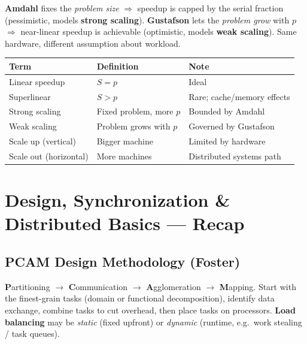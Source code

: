 \documentclass[11pt,a4paper]{article}
\begin{document}
\begin{alertbox}
\textbf{Amdahl} fixes the \emph{problem size} $\Rightarrow$ speedup is capped by the serial fraction (pessimistic, models \textbf{strong scaling}). \textbf{Gustafson} lets the \emph{problem grow} with $p$ $\Rightarrow$ near-linear speedup is achievable (optimistic, models \textbf{weak scaling}). Same hardware, different assumption about workload.
\end{alertbox}

\begin{longtable}{@{}p{3.8cm}p{4.4cm}p{5.0cm}@{}}
\toprule
\rowcolor{primary!15}
\textbf{Term} & \textbf{Definition} & \textbf{Note} \\
\midrule
\endhead
Linear speedup & $S = p$ & Ideal \\
Superlinear & $S > p$ & Rare; cache/memory effects \\
Strong scaling & Fixed problem, more $p$ & Bounded by Amdahl \\
Weak scaling & Problem grows with $p$ & Governed by Gustafson \\
Scale up (vertical) & Bigger machine & Limited by hardware \\
Scale out (horizontal) & More machines & Distributed systems path \\
\bottomrule
\end{longtable}

\section{Design, Synchronization \& Distributed Basics --- Recap}

\subsection{PCAM Design Methodology (Foster)}
\textbf{P}artitioning $\to$ \textbf{C}ommunication $\to$ \textbf{A}gglomeration $\to$ \textbf{M}apping. Start with the finest-grain tasks (domain or functional decomposition), identify data exchange, combine tasks to cut overhead, then place tasks on processors. \textbf{Load balancing} may be \emph{static} (fixed upfront) or \emph{dynamic} (runtime, e.g.\ work stealing / task queues).
\end{document}
